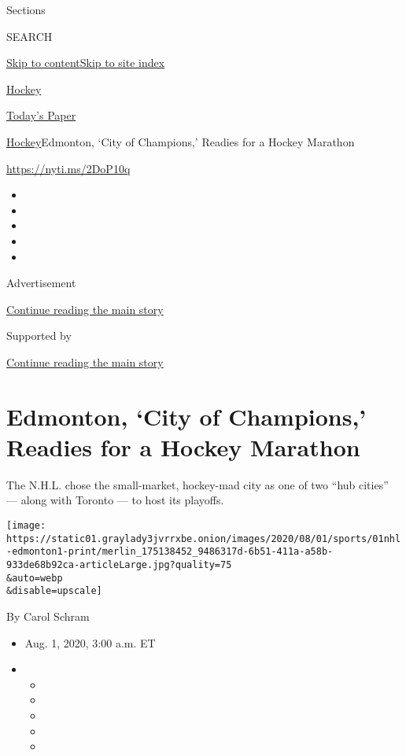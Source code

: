 Sections

SEARCH

\protect\hyperlink{site-content}{Skip to
content}\protect\hyperlink{site-index}{Skip to site index}

\href{https://www.nytimes3xbfgragh.onion/section/sports/hockey}{Hockey}

\href{https://myaccount.nytimes3xbfgragh.onion/auth/login?response_type=cookie\&client_id=vi}{}

\href{https://www.nytimes3xbfgragh.onion/section/todayspaper}{Today's
Paper}

\href{/section/sports/hockey}{Hockey}\textbar{}Edmonton, `City of
Champions,' Readies for a Hockey Marathon

\url{https://nyti.ms/2DoP10q}

\begin{itemize}
\item
\item
\item
\item
\item
\end{itemize}

Advertisement

\protect\hyperlink{after-top}{Continue reading the main story}

Supported by

\protect\hyperlink{after-sponsor}{Continue reading the main story}

\hypertarget{edmonton-city-of-champions-readies-for-a-hockey-marathon}{%
\section{Edmonton, `City of Champions,' Readies for a Hockey
Marathon}\label{edmonton-city-of-champions-readies-for-a-hockey-marathon}}

The N.H.L. chose the small-market, hockey-mad city as one of two ``hub
cities'' --- along with Toronto --- to host its playoffs.

\texttt{[image: https://static01.graylady3jvrrxbe.onion/images/2020/08/01/sports/01nhl-edmonton1-print/merlin\_175138452\_9486317d-6b51-411a-a58b-933de68b92ca-articleLarge.jpg?quality=75\\\&auto=webp\\\&disable=upscale]}

By Carol Schram

\begin{itemize}
\item
  Aug. 1, 2020, 3:00 a.m. ET
\item
  \begin{itemize}
  \item
  \item
  \item
  \item
  \item
  \end{itemize}
\end{itemize}

